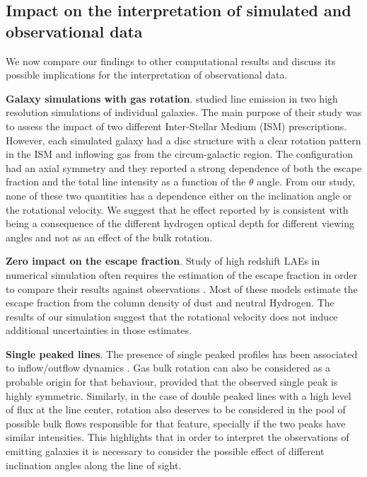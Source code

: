 \documentclass{emulateapj}
\newcommand{\ly}{{\ifmmode{{\rm Ly}\alpha~}\else{Ly$\alpha$~}\fi}}
\begin{document}
\subsection{Impact on the interpretation of simulated and
  observational data}


We now compare our findings to other computational results and discuss
its possible implications  for the interpretation of observational data.

{\bf Galaxy simulations with gas rotation}. \cite{Verhamme12} studied \ly
line emission in two high resolution simulations of individual
galaxies. 
The main purpose of their study was to assess the impact of two
different Inter-Stellar Medium (ISM) prescriptions. 
However, each simulated galaxy had a disc structure with a clear rotation pattern in
the ISM and inflowing gas from the circum-galactic region. 
The configuration had an axial symmetry and they reported a strong dependence of both
the escape fraction and the total line intensity as a function of the
$\theta$ angle. 
From our study, none of these two quantities has a dependence either
on the inclination angle or the rotational velocity. 
We suggest that he effect reported by \cite{Verhamme12} is
consistent with being a consequence of the different hydrogen optical
depth for different viewing angles and not as an effect of the bulk
rotation.


{\bf Zero impact on the \ly escape fraction}. Study of
high redshift LAEs in numerical simulation often requires the
estimation of the \ly escape fraction in order to compare their
results against observations
\citep{CLARA,Dayal2012,Forero12,Orsi12,Garel2012}. Most of these
models estimate the escape fraction from the column density of dust and
neutral Hydrogen. The results of our simulation suggest that the
rotational velocity does not induce additional uncertainties in those
estimates.


{\bf Single peaked lines}. The presence of single peaked profiles has
been associated to inflow/outflow dynamics
\citep{Verhamme06,DijkstraKramer}. 
Gas bulk rotation can also be considered as a probable origin for that
behaviour, provided that the observed single peak is highly
symmetric. 
Similarly, in the case of double peaked lines with a high
level of flux at the line center, rotation also deserves to be
considered in the pool of possible bulk flows responsible for that feature,
specially if the two peaks have similar intensities. 
This highlights
that in order to interpret the observations of \ly emitting galaxies
it is necessary to consider the possible effect of different
inclination angles along the line of sight.
\end{document}
